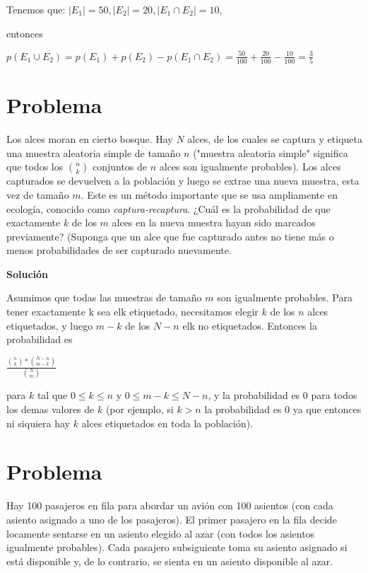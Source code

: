 \documentclass[12pt]{article}
\begin{document}
Tenemos que:
$|E_1|=50, |E_2|=20,|E_1 \cap E_2|=10,$

entonces

$p(E_1 \cup E_2)=p(E_1)+p(E_2)-p(E_1 \cap E_2) = \frac{50}{100} + \frac{20}{100} - \frac{10}{100} = \frac{3}{5}$


\section{Problema}

Los alces moran en cierto bosque. Hay $N$ alces, de los cuales se captura y
etiqueta una muestra aleatoria simple de tamaño $n$ ("muestra aleatoria simple"
significa que todos los $\binom{n}{k}$ conjuntos de $n$ alces son igualmente
probables). Los alces capturados se devuelven a la población y luego se extrae
una nueva muestra, esta vez de tamaño $m$. Este es un método importante que se
usa ampliamente en ecología, conocido como \textit{captura-recaptura}. ¿Cuál es
la probabilidad de que exactamente $k$ de los $m$ alces en la nueva muestra
hayan sido marcados previamente? (Suponga que un alce que fue capturado antes no
tiene más o menos probabilidades de ser capturado nuevamente.

\textbf{Solución}

Asumimos que todas las muestras de tamaño $m$ son igualmente probables. Para
tener exactamente k sea elk etiquetado, necesitamos elegir $k$ de los $n$ alces
etiquetados, y luego $m-k$ de los $N-n$ elk no etiquetados. Entonces la
probabilidad es

$\frac{\binom{n}{k}*\binom{N-n}{m-k}}{\binom{N}{m}}$

para $k$ tal que $0 \leq k \leq n$ y $0 \leq m-k \leq N-n$, y la probabilidad es
0 para todos los demas valores de $k$ (por ejemplo, si $k > n$ la
probabilidad es 0 ya que entonces ni siquiera hay $k$ alces etiquetados en toda
la población).

\section{Problema}

Hay 100 pasajeros en fila para abordar un avión con 100 asientos (con cada
asiento asignado a uno de los pasajeros). El primer pasajero en la fila decide
locamente sentarse en un asiento elegido al azar (con todos los asientos
igualmente probables). Cada pasajero subsiguiente toma su asiento asignado si
está disponible y, de lo contrario, se sienta en un asiento disponible al azar.
\end{document}
